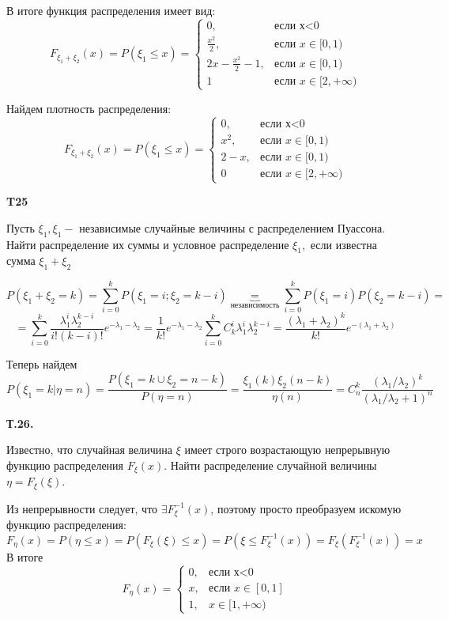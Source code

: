\documentclass[a4paper,12pt]{article} %
\begin{document}
\begin{example}
В итоге функция распределения имеет вид:
\[ F_{\xi_1+\xi_2}(x)=P(\xi_1 \le x) = 
\begin{cases} 
	0,   & \text{если х<0} \\ 
	\frac{x^2}{2},  &\text{если }  x\in[0,1) \\
	2x-\frac{x^2}{2}-1, &\text{если }  x\in[0,1) \\
	1   &\text{если }  x\in[2,+\infty)   
\end{cases}  \]


Найдем плотность распределения:
\[ F_{\xi_1+\xi_2}(x)=P(\xi_1 \le x) = 
\begin{cases} 
	0,   & \text{если х<0} \\ 
	x^2,  &\text{если }  x\in[0,1) \\
	2-x, &\text{если }  x\in[0,1) \\
	0  &\text{если }  x\in[2,+\infty)   
\end{cases}  \]



\end{example}


\begin{example}\textbf{T25}

Пусть $\xi_{1}, \xi_{1} -$ независимые случайные величины с распределением Пуассона. 
Найти распределение их суммы и условное распределение $\xi_{1},$ если известна сумма $\xi_{1}+\xi_{2}$


\[ P(\xi_{1}+\xi_{2}=k)=\sum_{i=0}^{k}P(\xi_{1}=i;\xi_2=k-i) \underbrace{=}_{\text{независимость}}
\sum_{i=0}^{k}P(\xi_1=i)P(\xi_2=k-i)= \]
\[ = \sum_{i=0}^{k} \frac{\lambda_1^i \lambda_2^{k-i}}{i! (k-i)!} e^{-\lambda_1-\lambda_2}=
\frac{1}{k!} e^{-\lambda_1-\lambda_2}\sum_{i=0}^{k} C_k^i \lambda_1^i \lambda_2^{k-i}=
\frac{(\lambda_1+\lambda_2)^k}{k!}e^{-(\lambda_1+\lambda_2)}
\]

Теперь найдем 
\[ P(\xi_1=k|\eta =n) =\frac{P(\xi_1=k \cup \xi_2=n-k)}{P(\eta=n)}=
\frac{\xi_1(k)\xi_2(n-k)}{\eta(n)}= C_n^k\frac{(\lambda_1/\lambda_2)^k}{(\lambda_1/\lambda_2+1)^n}\]


\end{example}




\begin{example}\textbf{Т.26.} 

Известно, что случайная величина $\xi$ имеет строго возрастающую непрерывную функцию распределения $F_{\xi}(x) .$ 
Найти распределение случайной величины $\eta=F_{\xi}(\xi) .$


Из непрерывности следует, что $ \exists F^{-1}_\xi (x)$, поэтому просто преобразуем искомую функцию распределения:
\[ F_\eta (x)= 
P(\eta\le x)= P(F_\xi(\xi) \le x) = 
P(\xi\le F^{-1}_\xi (x) )= 
F_\xi(F^{-1}_\xi (x))=x \]
В итоге
\[ F_\eta(x)=
\begin{cases} 
	0,   & \text{если х<0} \\ 
	x,  & \text{если }  x\in[0,1] \\
	1, & x\in[1,+\infty)   
\end{cases}  \]


\end{example}
\end{document}
